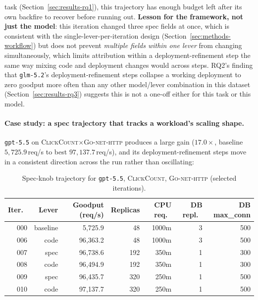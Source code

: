 task (Section~\ref{sec:results-rq1}), this trajectory has enough budget
left after its own backfire to recover before running out.
\textbf{Lesson for the framework, not just the model}: this iteration
changed three spec fields at once, which is consistent with the
single-lever-per-iteration design (Section~\ref{sec:methods-workflow}) but
does not prevent \emph{multiple fields within one lever} from changing
simultaneously, which limits attribution within a deployment-refinement step the
same way mixing code and deployment changes would across steps. RQ2's finding
that \texttt{glm-5.2}'s deployment-refinement steps collapse a working
deployment to zero goodput more often than any other model/lever
combination in this dataset (Section~\ref{sec:results-rq3}) suggests this
is not a one-off either for this task or this model.

\paragraph{Case study: a spec trajectory that tracks a workload's scaling
shape.} \texttt{gpt-5.5} on \textsc{ClickCount}$\times$\textsc{Go-net-http}
produces a large gain ($17.0\times$, baseline
$5{,}725.9$\,req/s to best $97{,}137.7$\,req/s), and its deployment-refinement
steps move in a consistent direction across the run rather than
oscillating:

\begin{table}[H]
  \centering
  \caption{Spec-knob trajectory for \texttt{gpt-5.5}, \textsc{ClickCount},
    \textsc{Go-net-http} (selected iterations).}
  \label{tab:results-case-clickcount}
  \footnotesize
  \begin{tabular}{@{}rrrrrrr@{}}
    \toprule
    Iter.\ & Lever & Goodput (req/s) & Replicas & CPU req.\ & DB repl.\ & DB max\_conn \\
    \midrule
    000 & baseline & 5{,}725.9  & 48  & 1000m & 3 & 500 \\
    006 & code     & 96{,}363.2 & 48  & 1000m & 3 & 500 \\
    007 & spec     & 96{,}738.6 & 192 & 350m  & 1 & 300 \\
    008 & code     & 96{,}494.9 & 192 & 350m  & 1 & 300 \\
    009 & spec     & 96{,}435.7 & 320 & 250m  & 1 & 500 \\
    010 & code     & 97{,}137.7 & 320 & 250m  & 1 & 500 \\
    \bottomrule
  \end{tabular}
\end{table}

